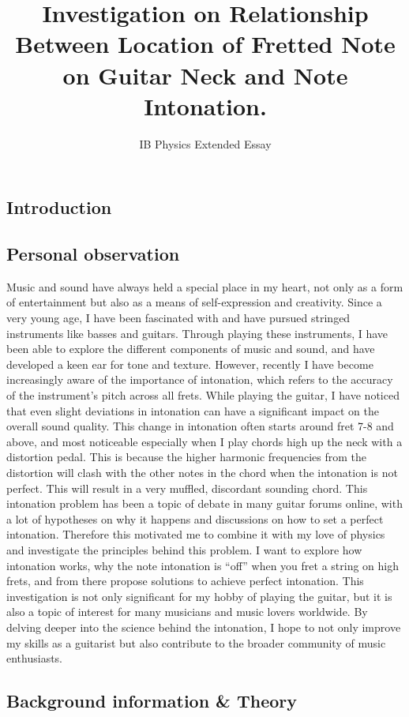\documentclass[11pt]{article}
\title{Investigation on Relationship Between Location of Fretted Note on Guitar Neck and Note Intonation.}
\author{IB Physics Extended Essay}
\begin{document}
    \maketitle
    \newpage
    \tableofcontents
    \newpage
    \begin{flushleft}
    \section{Introduction}
        \subsection{Personal observation}
            Music and sound have always held a special place in my heart, not only as a form of entertainment but also as a means of self-expression and creativity. Since a very young age, I have been fascinated with and have pursued stringed instruments like basses and guitars. Through playing these instruments, I have been able to explore the different components of music and sound, and have developed a keen ear for tone and texture. However, recently I have become increasingly aware of the importance of intonation, which refers to the accuracy of the instrument's pitch across all frets. While playing the guitar, I have noticed that even slight deviations in intonation can have a significant impact on the overall sound quality. This change in intonation often starts around fret 7-8 and above, and most noticeable especially when I play chords high up the neck with a distortion pedal. This is because the higher harmonic frequencies from the distortion will clash with the other notes in the chord when the intonation is not perfect. This will result in a very muffled, discordant sounding chord. This intonation problem has been a topic of debate in many guitar forums online, with a lot of hypotheses on why it happens and discussions on how to set a perfect intonation. Therefore this motivated me to combine it with my love of physics and investigate the principles behind this problem. I want to explore how intonation works, why the note intonation is “off” when you fret a string on high frets, and from there propose solutions to achieve perfect intonation. This investigation is not only significant for my hobby of playing the guitar, but it is also a topic of interest for many musicians and music lovers worldwide. By delving deeper into the science behind the intonation, I hope to not only improve my skills as a guitarist but also contribute to the broader community of music enthusiasts.
        \subsection{Background information \& Theory}

\end{flushleft}
\end{document}
